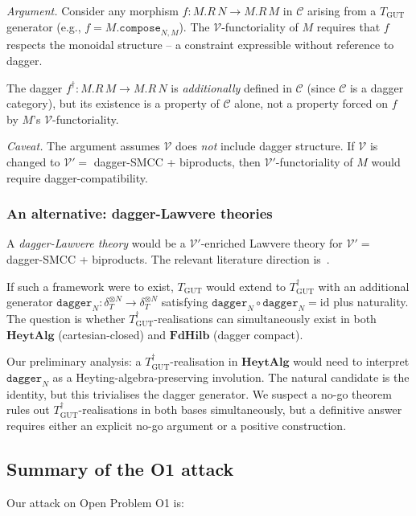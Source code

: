 \documentclass[11pt,a4paper]{article}
\theoremstyle{plain}
\theoremstyle{definition}
\theoremstyle{remark}
\newcommand{\cat}[1]{\mathbf{#1}}
\newcommand{\HeytAlg}{\cat{HeytAlg}}
\newcommand{\FdHilb}{\cat{FdHilb}}
\newcommand{\id}{\mathrm{id}}
\newcommand{\TGUT}{T_{\mathrm{GUT}}}
\newcommand{\TGUTd}{T_{\mathrm{GUT}}^{\dagger}}
\newcommand{\smcc}{SMCC}
\begin{document}
\emph{Argument.} Consider any morphism $f : M.R\,N \to M.R\,M$ in $\mathcal{C}$ arising from a $\TGUT$ generator (e.g., $f = M.\mathtt{compose}_{N,M}$). The $\mathcal{V}$-functoriality of $M$ requires that $f$ respects the monoidal structure -- a constraint expressible without reference to dagger.

The dagger $f^\dagger : M.R\,M \to M.R\,N$ is \emph{additionally} defined in $\mathcal{C}$ (since $\mathcal{C}$ is a dagger category), but its existence is a property of $\mathcal{C}$ alone, not a property forced on $f$ by $M$'s $\mathcal{V}$-functoriality.

\emph{Caveat.} The argument assumes $\mathcal{V}$ does \emph{not} include dagger structure. If $\mathcal{V}$ is changed to $\mathcal{V}' = $ dagger-\smcc{} + biproducts, then $\mathcal{V}'$-functoriality of $M$ would require dagger-compatibility.

\subsubsection{An alternative: dagger-Lawvere theories}\label{sec:o1:dagger-lawvere}

A \emph{dagger-Lawvere theory} would be a $\mathcal{V}'$-enriched Lawvere theory for $\mathcal{V}' = $ dagger-\smcc{} + biproducts. The relevant literature direction is~\cite{HK19}.

If such a framework were to exist, $\TGUT$ would extend to $\TGUTd$ with an additional generator $\mathtt{dagger}_N : \delta_T^{\otimes N} \to \delta_T^{\otimes N}$ satisfying $\mathtt{dagger}_N \circ \mathtt{dagger}_N = \id$ plus naturality. The question is whether $\TGUTd$-realisations can simultaneously exist in both $\HeytAlg$ (cartesian-closed) and $\FdHilb$ (dagger compact).

Our preliminary analysis: a $\TGUTd$-realisation in $\HeytAlg$ would need to interpret $\mathtt{dagger}_N$ as a Heyting-algebra-preserving involution. The natural candidate is the identity, but this trivialises the dagger generator. We suspect a no-go theorem rules out $\TGUTd$-realisations in both bases simultaneously, but a definitive answer requires either an explicit no-go argument or a positive construction.

\subsection{Summary of the O1 attack}\label{sec:o1:summary}

Our attack on Open Problem O1 is:
\end{document}
